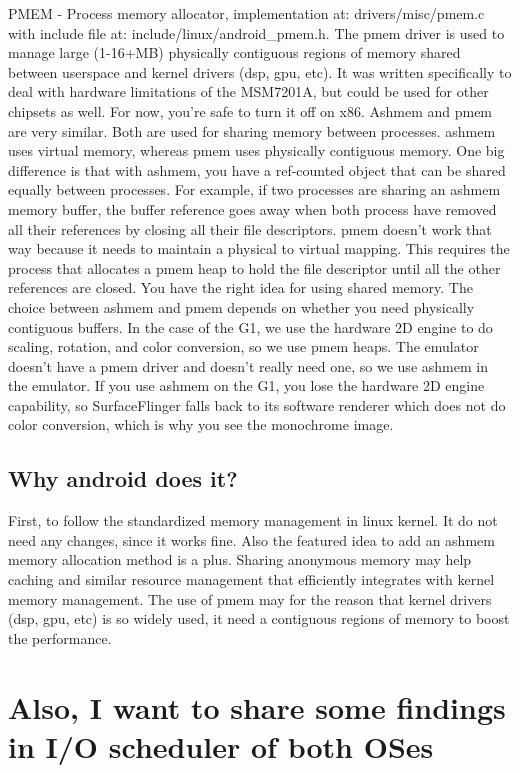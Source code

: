 \documentclass[12pt,letterpaper]{article}
\begin{document}
\indent PMEM - Process memory allocator, implementation at: drivers/misc/pmem.c with include file at: include/linux/android_pmem.h. The pmem driver is used to manage large (1-16+MB) physically contiguous
regions of memory shared between userspace and kernel drivers (dsp, gpu,
etc).  It was written specifically to deal with hardware limitations of
the MSM7201A, but could be used for other chipsets as well.  For now,
you're safe to turn it off on x86.\newline
 \indent Ashmem and pmem are very similar. Both are used for sharing memory 
between processes. ashmem uses virtual memory, whereas pmem uses 
physically contiguous memory. One big difference is that with ashmem, 
you have a ref-counted object that can be shared equally between 
processes. For example, if two processes are sharing an ashmem memory 
buffer, the buffer reference goes away when both process have removed 
all their references by closing all their file descriptors. pmem 
doesn't work that way because it needs to maintain a physical to 
virtual mapping. This requires the process that allocates a pmem heap 
to hold the file descriptor until all the other references are closed. \newline
\indent You have the right idea for using shared memory. The choice between 
ashmem and pmem depends on whether you need physically contiguous 
buffers. In the case of the G1, we use the hardware 2D engine to do 
scaling, rotation, and color conversion, so we use pmem heaps. The 
emulator doesn't have a pmem driver and doesn't really need one, so we 
use ashmem in the emulator. If you use ashmem on the G1, you lose the 
hardware 2D engine capability, so SurfaceFlinger falls back to its 
software renderer which does not do color conversion, which is why you 
see the monochrome image. 

\subsection{Why android does it?}
First, to follow the standardized memory management in linux kernel. It do not need any changes, since it works fine. Also the featured idea to add an ashmem memory allocation method is a plus. Sharing anonymous memory may help caching and similar resource management that efficiently integrates with kernel memory management. The use of pmem may for the reason that kernel drivers (dsp, gpu,
etc) is so widely used, it need a contiguous regions of memory to boost the performance.

\section{Also, I want to share some findings in I/O scheduler of both OSes}
\end{document}
